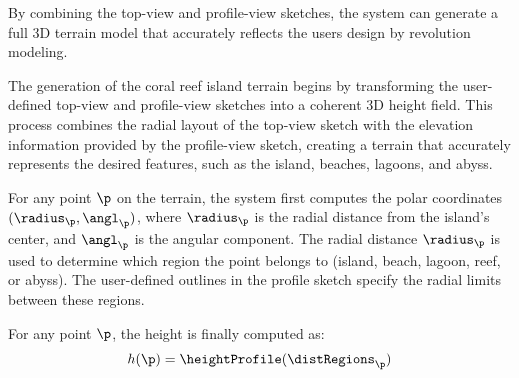 By combining the top-view and profile-view sketches, the system can generate a full 3D terrain model that accurately reflects the users design by revolution modeling.

The generation of the coral reef island terrain begins by transforming the user-defined top-view and profile-view sketches into a coherent 3D height field. This process combines the radial layout of the top-view sketch with the elevation information provided by the profile-view sketch, creating a terrain that accurately represents the desired features, such as the island, beaches, lagoons, and abyss.

For any point $\p$ on the terrain, the system first computes the polar coordinates $(\radius_\p, \angl_\p)$, where $\radius_\p$ is the radial distance from the island's center, and $\angl_\p$ is the angular component. The radial distance $\radius_\p$ is used to determine which region the point belongs to (island, beach, lagoon, reef, or abyss). The user-defined outlines in the profile sketch specify the radial limits between these regions.


For any point $\p$, the height is finally computed as:
\begin{align}
    h(\p) = \heightProfile(\distRegions_\p)
\end{align}

